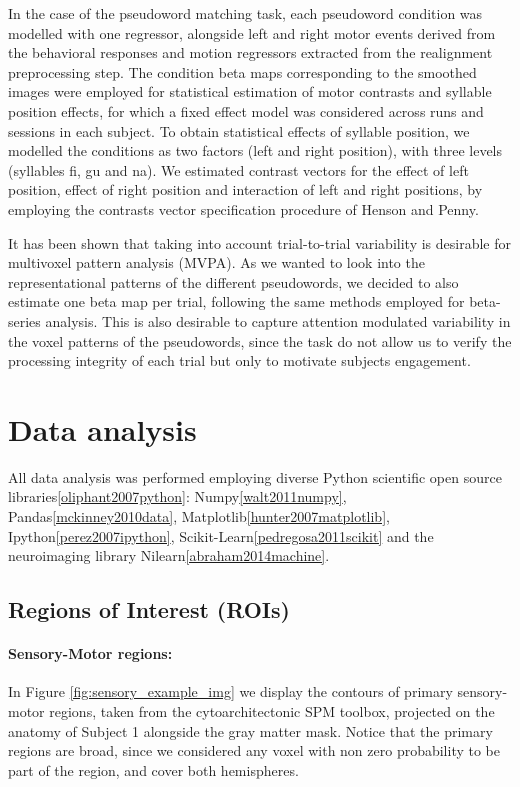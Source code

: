 In the case of the pseudoword matching task, each pseudoword condition was modelled with one regressor, alongside left and right motor events derived from the behavioral responses and motion regressors extracted from the realignment preprocessing step.
The condition beta maps corresponding to the smoothed images were employed for statistical estimation of motor contrasts and syllable position effects, for which a fixed effect model was considered across runs and sessions in each subject.
To obtain statistical effects of syllable position, we modelled the conditions as two factors (left and right position), with three levels (syllables fi, gu and na).
We estimated contrast vectors for the effect of left position, effect of right position and interaction of left and right positions, by employing the contrasts vector specification procedure of Henson and Penny\citep{henson2003anovas}.

It has been shown that taking into account trial-to-trial variability is desirable for multivoxel pattern analysis (MVPA)\citep{abdulrahman2016effect, mumford2012deconvolving}.
As we wanted to look into the representational patterns of the different pseudowords, we decided to also estimate one beta map per trial, following the same methods employed for beta-series analysis\citep{cisler2014comparison}.
This is also desirable to capture attention modulated variability in the voxel patterns of the pseudowords, since the task do not allow us to verify the processing integrity of each trial but only to motivate subjects engagement.


\section{Data analysis}

All data analysis was performed employing diverse Python scientific open source libraries\ref{oliphant2007python}: Numpy\ref{walt2011numpy}, Pandas\ref{mckinney2010data}, Matplotlib\ref{hunter2007matplotlib}, Ipython\ref{perez2007ipython}, Scikit-Learn\ref{pedregosa2011scikit} and the neuroimaging library Nilearn\ref{abraham2014machine}.

\subsection{Regions of Interest (ROIs)}

\paragraph{Sensory-Motor regions:}
In Figure \ref{fig:sensory_example_img} we display the contours of primary sensory-motor regions, taken from the cytoarchitectonic SPM toolbox\citep{eickhoff2005new}, projected on the anatomy of Subject 1 alongside the gray matter mask.
Notice that the primary regions are broad, since we considered any voxel with non zero probability to be part of the region, and cover both hemispheres.


